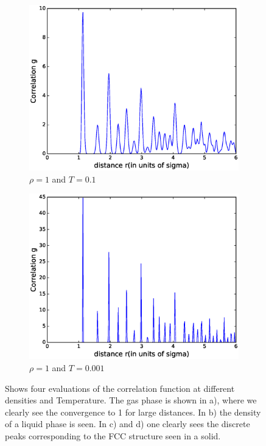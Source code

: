 \documentclass[twoside]{article}
\begin{document}
\begin{figure}[h]
	\begin{subfigure}[b]{0.48\textwidth}
		\centering
		\includegraphics[width=0.9\linewidth]{fig/figure_corr_solid.eps}
		\caption{$\rho = 1$ and $T = 0.1$}
		\label{fig:figure_corr_solid}
	\end{subfigure}
	\begin{subfigure}[b]{0.48\textwidth}
		\centering
		\includegraphics[width=0.9\linewidth]{fig/figure_corr_solid2.eps}
		\caption{$\rho = 1$ and $T = 0.001$}
		\label{fig:figure_corr_solid2}
	\end{subfigure}
	\caption{Shows four evaluations of the correlation function at different densities and Temperature. The gas phase is shown in a), where we clearly see the convergence to 1 for large distances. In b) the density of a liquid phase is seen. In c) and d) one clearly sees the discrete peaks corresponding to the FCC structure seen in a solid.}
	\label{fig:figure_corr}
\end{figure}
\end{document}
